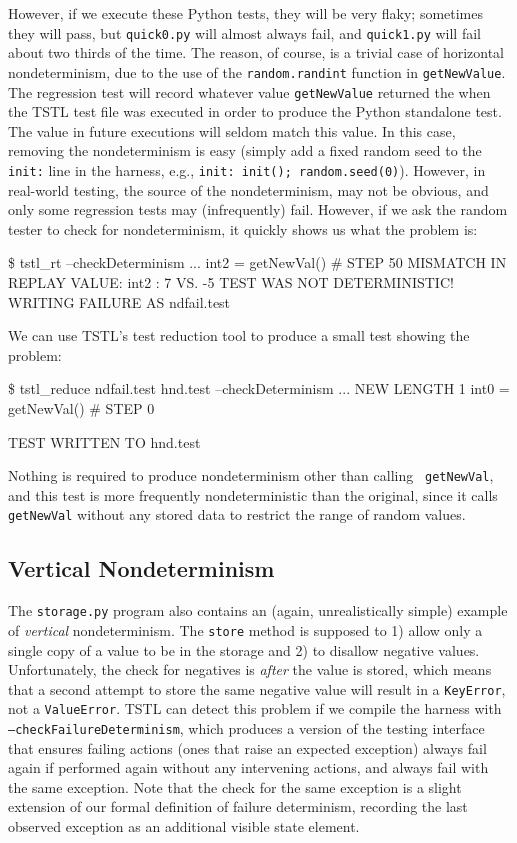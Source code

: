 However, if we execute these Python tests, they will be very flaky;
sometimes they will pass, but {\tt quick0.py} will almost always fail, and
{\tt quick1.py} will fail about two thirds of the time.  The reason,
of course, is a trivial case of horizontal nondeterminism, due to the
use of the {\tt random.randint} function in {\tt getNewValue}.  The
regression test will record whatever value {\tt getNewValue} returned
the when the TSTL test file was executed in order to produce the
Python standalone test.  The value in future executions will seldom
match this value.  In this case, removing the nondeterminism is easy
(simply add a fixed random seed to the {\tt init:} line in the
harness, e.g., {\tt init: init(); random.seed(0)}).  However, in
real-world testing, the source of the nondeterminism, may not be
obvious, and only some regression tests may (infrequently) fail.
However, if we ask the random tester to check for nondeterminism, it
quickly shows us what the problem is:

{\scriptsize
\begin{code}
 \$ tstl\_rt --checkDeterminism
 ...
 int2 = getNewVal()              \# STEP 50
 MISMATCH IN REPLAY VALUE:
    int2 : 7 VS. -5
 TEST WAS NOT DETERMINISTIC!  WRITING FAILURE AS
 ndfail.test
\end{code}
}

We can use TSTL's test reduction tool to produce a small test showing
the problem:

{\scriptsize
\begin{code}
 \$ tstl\_reduce ndfail.test hnd.test --checkDeterminism
 ...
 NEW LENGTH 1
 int0 = getNewVal()              \# STEP 0

 TEST WRITTEN TO hnd.test
\end{code}
}

Nothing is required to produce nondeterminism other than calling {\tt
  getNewVal}, and this test is more frequently nondeterministic than
the original, since it calls {\tt getNewVal} without any stored data
to restrict the range of random values.

\subsection{Vertical Nondeterminism}

The {\tt storage.py} program also contains an (again, unrealistically
simple) example of \emph{vertical} nondeterminism.  The {\tt store}
method is supposed to 1) allow only a single copy of a value to be in
the storage and 2) to disallow negative values.  Unfortunately, the
check for negatives is \emph{after} the value is stored, which means
that a second attempt to store the same negative value will result in
a {\tt KeyError}, not a {\tt ValueError}.  TSTL can detect this
problem if we compile the harness with {\tt
  --checkFailureDeterminism}, which produces a version of the testing
interface that ensures failing actions (ones that raise an expected
exception) always fail again if performed again without any
intervening actions, and always fail with the same exception.  Note
that the check for the same exception is a slight extension of our formal
definition of failure determinism, recording the last observed
exception as an additional visible state element.

